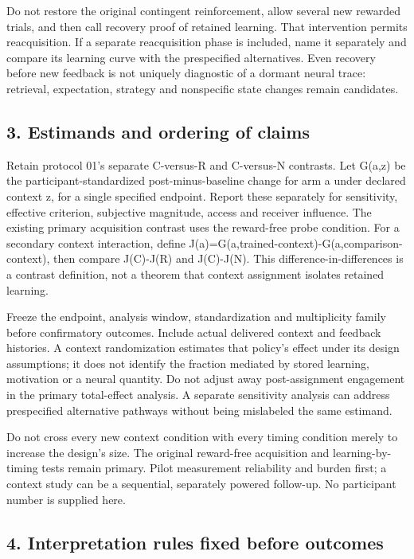 \documentclass[
  american,
  11pt,
  letterpaper,
]{article}
\begin{document}
Do not restore the original contingent reinforcement, allow several new rewarded trials, and then call recovery proof of retained learning. That intervention permits reacquisition. If a separate reacquisition phase is included, name it separately and compare its learning curve with the prespecified alternatives. Even recovery before new feedback is not uniquely diagnostic of a dormant neural trace: retrieval, expectation, strategy and nonspecific state changes remain candidates.

\subsection{3. Estimands and ordering of claims}\label{estimands-and-ordering-of-claims}

Retain protocol 01's separate C-versus-R and C-versus-N contrasts. Let G(a,z) be the participant-standardized post-minus-baseline change for arm a under declared context z, for a single specified endpoint. Report these separately for sensitivity, effective criterion, subjective magnitude, access and receiver influence. The existing primary acquisition contrast uses the reward-free probe condition. For a secondary context interaction, define J(a)=G(a,trained-context)-G(a,comparison-context), then compare J(C)-J(R) and J(C)-J(N). This difference-in-differences is a contrast definition, not a theorem that context assignment isolates retained learning.

Freeze the endpoint, analysis window, standardization and multiplicity family before confirmatory outcomes. Include actual delivered context and feedback histories. A context randomization estimates that policy's effect under its design assumptions; it does not identify the fraction mediated by stored learning, motivation or a neural quantity. Do not adjust away post-assignment engagement in the primary total-effect analysis. A separate sensitivity analysis can address prespecified alternative pathways without being mislabeled the same estimand.

Do not cross every new context condition with every timing condition merely to increase the design's size. The original reward-free acquisition and learning-by-timing tests remain primary. Pilot measurement reliability and burden first; a context study can be a sequential, separately powered follow-up. No participant number is supplied here.

\subsection{4. Interpretation rules fixed before outcomes}\label{interpretation-rules-fixed-before-outcomes}
\end{document}
